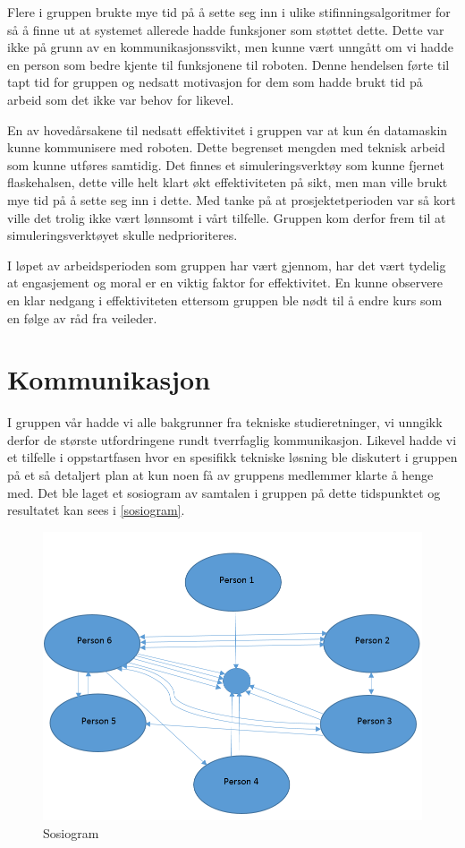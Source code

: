 Flere i gruppen brukte mye tid på å sette seg inn i ulike stifinnings\-algoritmer for så å finne ut at systemet allerede hadde funksjoner som støttet dette. Dette var ikke på grunn av en kommunikasjonssvikt, men kunne vært unngått om vi hadde en person som bedre kjente til funksjonene til roboten. Denne hendelsen førte til tapt tid for gruppen og nedsatt motivasjon for dem som hadde brukt tid på arbeid som det ikke var behov for likevel. 

En av hovedårsakene til nedsatt effektivitet i gruppen var at kun én datamaskin kunne kommunisere med roboten. Dette begrenset mengden med teknisk arbeid som kunne utføres samtidig. Det finnes et simuleringsverktøy som kunne fjernet flaskehalsen, dette ville helt klart økt effektiviteten på sikt, men man ville brukt mye tid på å sette seg inn i dette. Med tanke på at prosjektetperioden var så kort ville det trolig ikke vært lønnsomt i vårt tilfelle. Gruppen kom derfor frem til at simuleringsverktøyet skulle nedprioriteres.

I løpet av arbeidsperioden som gruppen har vært gjennom, har det vært tydelig at engasjement og moral er en viktig faktor for effektivitet. En kunne observere en klar nedgang i effektiviteten ettersom gruppen ble nødt til å endre kurs som en følge av råd fra veileder.  

\section{Kommunikasjon}
I gruppen vår hadde vi alle bakgrunner fra tekniske studieretninger, vi unngikk derfor de største utfordringene rundt tverrfaglig kommunikasjon. Likevel hadde vi et tilfelle i oppstartfasen hvor en spesifikk tekniske løsning ble diskutert i gruppen på et så detaljert plan at kun noen få av gruppens medlemmer klarte å henge med. Det ble laget et sosiogram av samtalen i gruppen på dette tidspunktet og resultatet kan sees i \autoref{sosiogram}.

\begin{figure}[!ht]
    \centering
    \includegraphics[scale=0.7]{gfx/sosiogram1.PNG}
    \caption{Sosiogram}
    \label{sosiogram}
\end{figure}

